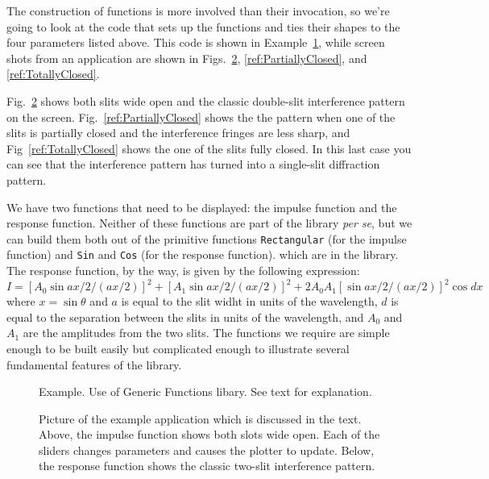 \documentclass{report}
\begin{document}
\noindent The construction of functions is more involved than their invocation, so we're
going to look at the code that sets up the functions and ties their shapes
to the four parameters listed above.  This code is shown in 
Example~\ref{ref:ExampleCode}, while screen shots from an application are shown
in Figs.~\ref{ref:WideOpen}, \ref{ref:PartiallyClosed}, and \ref{ref:TotallyClosed}.

\noindent Fig.~\ref{ref:WideOpen} shows both slits wide open and the classic double-slit
interference pattern on the screen.  Fig.~\ref{ref:PartiallyClosed} shows the 
the pattern when one of the slits is partially closed and the interference
fringes are less sharp, and Fig~\ref{ref:TotallyClosed} shows the one of the
slits fully closed.  In this last case you can see that the interference pattern
has turned into a single-slit diffraction pattern.

\noindent We have two functions that need to be displayed:  the impulse function and the
response function.  Neither of these functions are part of the library {\it per
se}, but we can build them both out of the primitive functions \verb#Rectangular#
(for the impulse function) and \verb#Sin# and \verb#Cos# (for the response
function).  which are in the library.  The response function, by the way, is
given by the following expression:
\begin{displaymath}
	I = \left[ A_0 \sin{ax/2}/(ax/2) \right ]^2 + 
	    \left[ A_1 \sin{ax/2}/(ax/2) \right ]^2 +
	    2A_0A_1\left[\sin{ax/2}/(ax/2) \right ]^2 \cos{dx}
\end{displaymath}
where $x=\sin{\theta}$ and $a$ is equal to the slit widht in units of the wavelength,
$d$ is equal to the separation between the slits in units of the wavelength, and $A_0$
and $A_1$ are the amplitudes from the two slits.  The functions we require are simple 
enough to be built easily but complicated enough to illustrate several fundamental
features of the library.
 
\begin{figure}
\centerline{}
\caption{Example.  Use of Generic Functions libary.  See text for explanation.}
\label{ref:ExampleCode}
\end{figure}
 
   
\begin{figure}
\centerline{}
\caption{Picture of the example application which is discussed in the text.
Above, the impulse function shows both slots wide open. Each of the sliders
changes parameters and causes the plotter to update.  Below, the response function
shows the classic two-slit interference pattern.}
\label{ref:WideOpen}
\end{figure}
\end{document}
